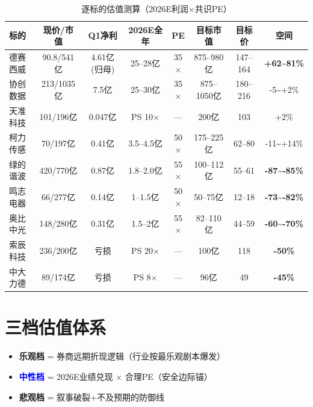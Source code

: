 \begin{table}[H]
\centering
\scriptsize
\renewcommand{\arraystretch}{1.2}
\begin{tabularx}{\textwidth}{l c c c c c c c}
\toprule
\textbf{标的} & \textbf{现价/市值} & \textbf{Q1净利} & \textbf{2026E全年} & \textbf{PE} & \textbf{目标市值} & \textbf{目标价} & \textbf{空间} \\
\midrule
德赛西威 & 90.8/541亿 & 4.61亿(归母) & 25--28亿 & 35$\times$ & 875--980亿 & 147--164 & \textcolor{riskgreen}{\textbf{+62\textasciitilde81\%}} \\
协创数据 & 213/1035亿 & 7.5亿 & 25--30亿 & 35$\times$ & 875--1050亿 & 180--216 & -5\textasciitilde+2\% \\
天准科技 & 101/196亿 & 0.047亿 & PS 10$\times$ & — & 200亿 & 103 & +2\% \\
柯力传感 & 70/197亿 & 0.41亿 & 3.5--4.5亿 & 50$\times$ & 175--225亿 & 62--80 & -11\textasciitilde+14\% \\
绿的谐波 & 420/770亿 & 0.87亿 & 1.8--2.0亿 & 55$\times$ & 100--112亿 & 55--61 & \textcolor{riskred}{\textbf{-87\textasciitilde-85\%}} \\
鸣志电器 & 66/277亿 & 0.14亿 & 1--1.5亿 & 50$\times$ & 50--75亿 & 12--18 & \textcolor{riskred}{\textbf{-73\textasciitilde-82\%}} \\
奥比中光 & 148/280亿 & 0.31亿 & 1.5--2亿 & 55$\times$ & 82--110亿 & 44--59 & \textcolor{riskred}{\textbf{-60\textasciitilde-70\%}} \\
索辰科技 & 236/200亿 & 亏损 & PS 20$\times$ & — & 100亿 & 118 & \textcolor{riskred}{\textbf{-50\%}} \\
中大力德 & 89/174亿 & 亏损 & PS 8$\times$ & — & 96亿 & 49 & \textcolor{riskred}{\textbf{-45\%}} \\
\bottomrule
\end{tabularx}
\caption{逐标的估值测算（2026E利润$\times$共识PE）}
\end{table}

\section{三档估值体系}

\begin{keyinsight}[三档估值体系说明]
\begin{itemize}[leftmargin=1.5em]
  \item \textcolor{riskamber}{\textbf{乐观档}} = 券商远期折现逻辑（行业按最乐观剧本爆发）
  \item \textcolor{blue}{\textbf{中性档}} = 2026E业绩兑现 $\times$ 合理PE（安全边际锚）
  \item \textcolor{riskgreen}{\textbf{悲观档}} = 叙事破裂+不及预期的防御线
\end{itemize}
\end{keyinsight}

